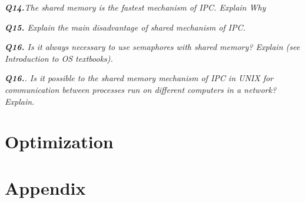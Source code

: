 \documentclass[11pt]{article}
\begin{document}
\vspace{5mm}
\textit{\textbf{Q14.}The shared memory is the fastest mechanism of IPC. Explain Why}
\vspace{5mm}


\vspace{5mm}
\textit{\textbf{Q15.} Explain the main disadvantage of shared mechanism of IPC.}
\vspace{5mm}


\vspace{5mm}
\textit{\textbf{Q16.} Is it always necessary to use semaphores with shared memory? Explain (see Introduction to OS textbooks).}
\vspace{5mm}

\vspace{5mm}
\textit{\textbf{Q16.}. Is it possible to the shared memory mechanism of IPC in UNIX for communication between processes run on different computers in a network? Explain.}
\vspace{5mm}


\section*{Optimization}


\newpage
\section*{Appendix}

\thispagestyle{empty}
\end{document}

